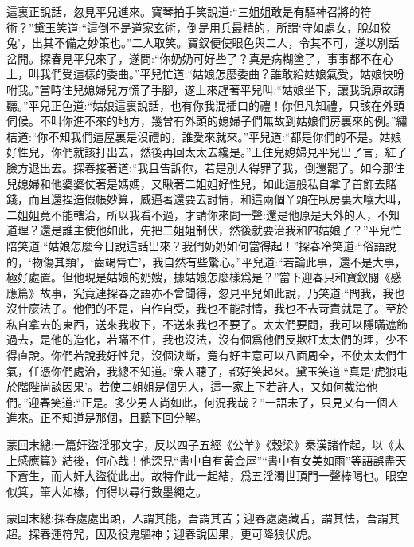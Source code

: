 \begin{parag}
    這裏正說話，忽見平兒進來。寶琴拍手笑說道:“三姐姐敢是有驅神召將的符術？”黛玉笑道:“這倒不是道家玄術，倒是用兵最精的，所謂‘守如處女，脫如狡兔’，出其不備之妙策也。”二人取笑。寶釵便使眼色與二人，令其不可，遂以別話岔開。探春見平兒來了，遂問:“你奶奶可好些了？真是病糊塗了，事事都不在心上，叫我們受這樣的委曲。”平兒忙道:“姑娘怎麼委曲？誰敢給姑娘氣受，姑娘快吩咐我。”當時住兒媳婦兒方慌了手腳，遂上來趕著平兒叫:“姑娘坐下，讓我說原故請聽。”平兒正色道:“姑娘這裏說話，也有你我混插口的禮！你但凡知禮，只該在外頭伺候。不叫你進不來的地方，幾曾有外頭的媳婦子們無故到姑娘們房裏來的例。”繡桔道:“你不知我們這屋裏是沒禮的，誰愛來就來。”平兒道:“都是你們的不是。姑娘好性兒，你們就該打出去，然後再回太太去纔是。”王住兒媳婦見平兒出了言，紅了臉方退出去。探春接著道:“我且告訴你，若是別人得罪了我，倒還罷了。如今那住兒媳婦和他婆婆仗著是媽媽，又瞅著二姐姐好性兒，如此這般私自拿了首飾去賭錢，而且還捏造假帳妙算，威逼著還要去討情，和這兩個丫頭在臥房裏大嚷大叫，二姐姐竟不能轄治，所以我看不過，才請你來問一聲:還是他原是天外的人，不知道理？還是誰主使他如此，先把二姐姐制伏，然後就要治我和四姑娘了？”平兒忙陪笑道:“姑娘怎麼今日說這話出來？我們奶奶如何當得起！”探春冷笑道:“俗語說的，‘物傷其類’，‘齒竭脣亡’，我自然有些驚心。”平兒道:“若論此事，還不是大事，極好處置。但他現是姑娘的奶嫂，據姑娘怎麼樣爲是？”當下迎春只和寶釵閱《感應篇》故事，究竟連探春之語亦不曾聞得，忽見平兒如此說，乃笑道:“問我，我也沒什麼法子。他們的不是，自作自受，我也不能討情，我也不去苛責就是了。至於私自拿去的東西，送來我收下，不送來我也不要了。太太們要問，我可以隱瞞遮飾過去，是他的造化，若瞞不住，我也沒法，沒有個爲他們反欺枉太太們的理，少不得直說。你們若說我好性兒，沒個決斷，竟有好主意可以八面周全，不使太太們生氣，任憑你們處治，我總不知道。”衆人聽了，都好笑起來。黛玉笑道:“真是‘虎狼屯於階陛尚談因果’。若使二姐姐是個男人，這一家上下若許人，又如何裁治他們。”迎春笑道:“正是。多少男人尚如此，何況我哉？”一語未了，只見又有一個人進來。正不知道是那個，且聽下回分解。
\end{parag}


\begin{parag}
    \begin{note}蒙回末總:一篇奸盜淫邪文字，反以四子五經《公羊》《穀梁》秦漢諸作起，以《太上感應篇》結後，何心哉！他深見“書中自有黃金屋”“書中有女美如雨”等語誤盡天下蒼生，而大奸大盜從此出。故特作此一起結，爲五淫濁世頂門一聲棒喝也。眼空似箕，筆大如椽，何得以尋行數墨繩之。\end{note}
\end{parag}


\begin{parag}
    \begin{note}蒙回末總:探春處處出頭，人謂其能，吾謂其苦；迎春處處藏舌，謂其怯，吾謂其超。探春運符咒，因及役鬼驅神；迎春說因果，更可降狼伏虎。\end{note}
\end{parag}
